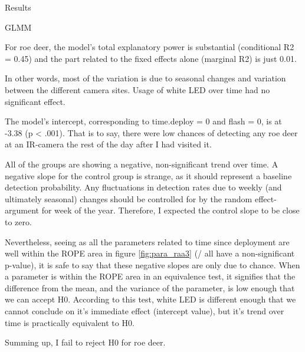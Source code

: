 Results

GLMM


For roe deer, the model's total explanatory power is substantial (conditional R2 = 0.45) and the part related to the fixed effects alone (marginal R2) is just 0.01.

In other words, most of the variation is due to seasonal changes and variation between the different camera sites. Usage of white LED over time had no significant effect.

The model's intercept, corresponding to time.deploy = 0 and flash = 0, is at -3.38 (p < .001).
That is to say, there were low chances of detecting any roe deer at an IR-camera the rest of the day after I had visited it.


All of the groups are showing a negative, non-significant trend over time.
A negative slope for the control group is strange, as it should represent a baseline detection probability. Any fluctuations in detection rates due to weekly (and ultimately seasonal) changes should be controlled for by the random effect-argument for week of the year. Therefore, I expected the control slope to be close to zero. 

Nevertheless, seeing as all the parameters related to time since deployment are well within the ROPE area in figure \vref{fig:para_raa3} (/ all have a non-significant p-value), it is safe to say that these negative slopes are only due to chance.
When a parameter is within the ROPE area in an equivalence test, it signifies that the difference from the mean, and the variance of the parameter, is low enough that we can accept H0. According to this test, white LED is different enough that we cannot conclude on it's immediate effect (intercept value), but it's trend over time is practically equivalent to H0.

Summing up, I fail to reject H0 for roe deer.

